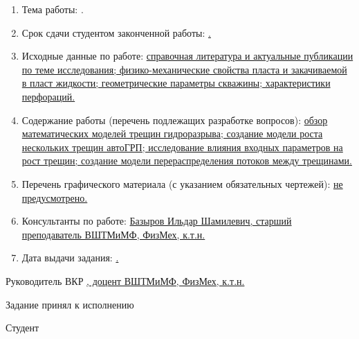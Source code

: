 \begin{enumerate}[1.]
	\item Тема работы: {\expandafter \ulined \thesisTitle.}
	\item Срок сдачи студентом законченной работы: \uline{\thesisDeadline.} 
	\item Исходные данные по работе: \uline{справочная литература и актуальные публикации по теме исследования; физико-механические свойства пласта и закачиваемой в пласт жидкости; геометрические параметры скважины; характеристики перфораций.}%
	\item Содержание работы (перечень подлежащих разработке вопросов): \uline{обзор математических моделей трещин гидроразрыва; создание модели роста нескольких трещин автоГРП; исследование влияния входных параметров на рост трещин; создание модели перераспределения потоков между трещинами.}
	\item Перечень графического материала (с указанием обязательных чертежей): \uline{не предусмотрено.}
		\item Консультанты по работе: \uline{Базыров Ильдар Шамилевич, старший преподаватель ВШТМиМФ, ФизМех, к.т.н.}
		\item Дата выдачи задания: \uline{\thesisStartDate.}
\end{enumerate}

\intervalS%

Руководитель ВКР \uline{\hspace*{0.09\textheight} \Supervisor, доцент ВШТМиМФ, ФизМех, к.т.н.}





\vspace{0.8\curtextsize}%


Задание принял к исполнению \uline{\thesisStartDate}

\vspace{0.7\curtextsize}%

Студент \uline{\hspace*{0.1\textheight}  \Author}



